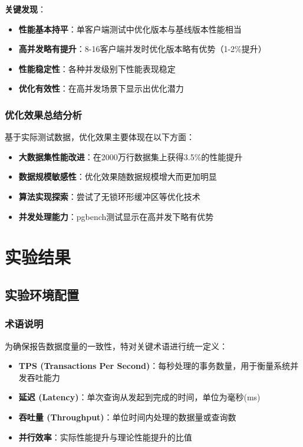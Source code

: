 \textbf{关键发现}：
\begin{itemize}
    \item \textbf{性能基本持平}：单客户端测试中优化版本与基线版本性能相当
    \item \textbf{高并发略有提升}：8-16客户端并发时优化版本略有优势（1-2\%提升）
    \item \textbf{性能稳定性}：各种并发级别下性能表现稳定
    \item \textbf{优化有效性}：在高并发场景下显示出优化潜力
\end{itemize}

\subsubsection{优化效果总结分析}

基于实际测试数据，优化效果主要体现在以下方面：
\begin{itemize}
    \item \textbf{大数据集性能改进}：在2000万行数据集上获得3.5\%的性能提升
    \item \textbf{数据规模敏感性}：优化效果随数据规模增大而更加明显
    \item \textbf{算法实现探索}：尝试了无锁环形缓冲区等优化技术
    \item \textbf{并发处理能力}：pgbench测试显示在高并发下略有优势
\end{itemize}

\section{实验结果}

\subsection{实验环境配置}

\subsubsection{术语说明}
为确保报告数据度量的一致性，特对关键术语进行统一定义：
\begin{itemize}
    \item \textbf{TPS (Transactions Per Second)}：每秒处理的事务数量，用于衡量系统并发吞吐能力
    \item \textbf{延迟 (Latency)}：单次查询从发起到完成的时间，单位为毫秒(ms)
    \item \textbf{吞吐量 (Throughput)}：单位时间内处理的数据量或查询数
    \item \textbf{并行效率}：实际性能提升与理论性能提升的比值
\end{itemize}

